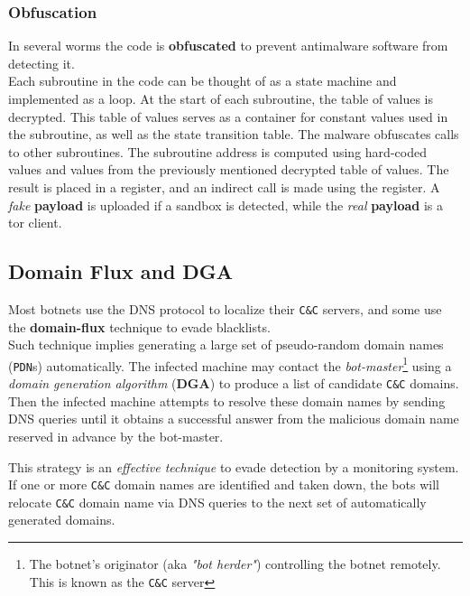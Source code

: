\subsubsection{Obfuscation}
In several worms the code is \textbf{obfuscated} to prevent antimalware software from detecting it.\\
Each subroutine in the code can be thought of as a state machine and implemented as a
loop. 
At the start of each subroutine, the table of values is decrypted.
This table of values serves as a container for constant values used in the
subroutine, as well as the state transition table.
The malware obfuscates calls to other subroutines.
The subroutine address
is computed using hard-coded values and values from the previously
mentioned decrypted table of values. The result is placed in a register, and an
indirect call is made using the register.
A \textit{fake} \textbf{payload} is uploaded if a sandbox is detected, while the \textit{real} \textbf{payload} is a tor client.

\subsection{Domain Flux and DGA}
Most botnets use the DNS protocol to localize their \texttt{C\&C} servers, and some
use the \textbf{domain-flux} technique to evade blacklists.\\
Such technique implies generating a large set of pseudo-random domain names (\texttt{PDN}s) automatically.
The infected machine may contact the \textit{bot-master}\footnote{The botnet's originator (aka \textit{"bot herder"}) controlling the botnet remotely. This is known as the \texttt{C\&C} server} using a \textit{domain generation
algorithm} (\textbf{DGA}) to produce a list of candidate \texttt{C\&C} domains.
Then the infected machine attempts to resolve these domain names by sending
DNS queries until it obtains a successful answer from the malicious domain name reserved in advance by the bot-master.

This strategy is an \textit{effective technique} to evade detection by a monitoring system.
If one or more \texttt{C\&C} domain names are identified and taken down, the bots will
relocate \texttt{C\&C} domain name via DNS queries to the next set of automatically
generated domains.
\nl

